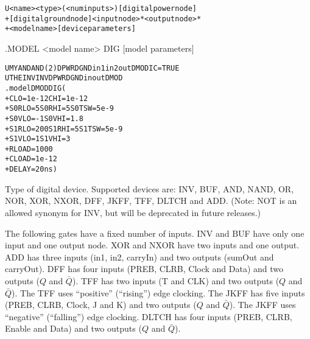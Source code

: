 

 
\begin{Device}\label{U_DEVICE}

 
\device
\begin{alltt}
U<name> <type>(<num inputs>) [digital power node] 
+ [digital ground node] <input node>* <output node>* 
+ <model name> [device parameters]
\end{alltt}
 
\model
.MODEL <model name> DIG [model parameters]
 
\examples
\begin{alltt}
UMYAND AND(2) DPWR DGND in1 in2 out DMOD IC=TRUE
UTHEINV INV DPWR DGND in out DMOD
.model DMOD DIG (
+ CLO=1e-12  CHI=1e-12
+ S0RLO=5  S0RHI=5  S0TSW=5e-9
+ S0VLO=-1  S0VHI=1.8
+ S1RLO=200  S1RHI=5  S1TSW=5e-9
+ S1VLO=1  S1VHI=3
+ RLOAD=1000
+ CLOAD=1e-12
+ DELAY=20ns )
\end{alltt}

\parameters 
\begin{Parameters}


Type of digital device.  Supported devices are: INV, BUF, AND, NAND, OR, NOR, XOR,
NXOR, DFF, JKFF, TFF, DLTCH and ADD.  (Note: NOT is an allowed synonym for INV, but will be
deprecated in future \Xyce{} releases.)

The following gates have a fixed number of inputs.  INV and BUF have only one
input and one output node.  XOR and NXOR have two inputs and one output.
ADD has three inputs (in1, in2, carryIn) and two outputs (sumOut
and carryOut).  DFF has four inputs (PREB, CLRB, Clock and Data) and
two outputs ($Q$ and $\bar{Q}$).  TFF has two inputs (T and CLK) and two
outputs ($Q$ and $\bar{Q}$).  The TFF uses ``positive'' (``rising'') edge clocking.
The JKFF has five inputs (PREB, CLRB, Clock, J and K) and two outputs ($Q$ and $\bar{Q}$).
The JKFF uses ``negative'' (``falling'') edge clocking.
DLTCH has four inputs (PREB, CLRB, Enable and Data) and two outputs ($Q$ and $\bar{Q}$).  


\end{Parameters}
\end{Device}
